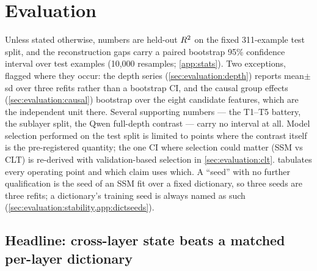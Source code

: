 \section{Evaluation}
\label{sec:evaluation}

Unless stated otherwise, numbers are held-out $R^2$ on the fixed 311-example
test split, and the reconstruction gaps carry a paired bootstrap 95\% confidence
interval over test examples (10{,}000 resamples; \cref{app:stats}). Two
exceptions, flagged where they occur: the depth series
(\cref{sec:evaluation:depth}) reports mean$\pm$sd over three refits rather than
a bootstrap CI, and the causal group effects (\cref{sec:evaluation:causal})
bootstrap over the eight candidate features, which are the independent unit
there. Several supporting numbers --- the T1--T5 battery, the sublayer split,
the Qwen full-depth contrast --- carry no interval at all. Model
selection performed on the test split is limited to points where the contrast
itself is the pre-registered quantity; the one CI where selection could matter
(SSM vs CLT) is re-derived with validation-based selection in
\cref{sec:evaluation:clt}.  tabulates every operating
point and which claim uses which. A ``seed'' with no further qualification
is the seed of an SSM fit over a fixed dictionary, so three seeds are three
refits; a dictionary's training seed is always named as such
(\cref{sec:evaluation:stability,app:dictseeds}).

\subsection{Headline: cross-layer state beats a matched per-layer dictionary}
\label{sec:evaluation:gate3}

